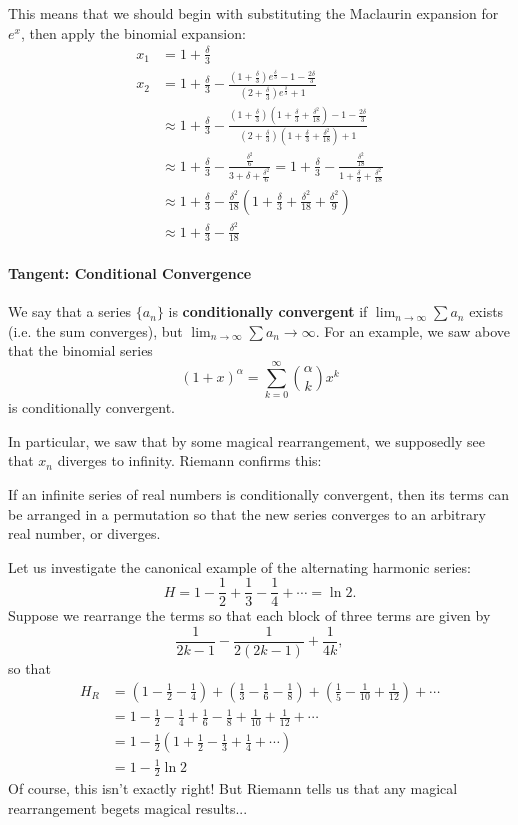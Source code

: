 \documentclass[../main.tex]{subfiles}
\begin{document}
This means that we should begin with substituting the Maclaurin expansion for $e^x$, then apply the binomial expansion:
\begin{align*}
    x_1 &= 1+\frac{\delta}{3}\\
    x_2 &= 1+\frac{\delta}{3}-\frac{\left(1+\frac{\delta}{3}\right)e^{\frac{\delta}{3}}-1-\frac{2\delta}{3}}{\left(2+\frac{\delta}{3}\right)e^\frac{\delta}{3}+1} \\
    &\approx 1+\frac{\delta}{3}-\frac{\left(1+\frac{\delta}{3}\right)\left(1+\frac{\delta}{3}+\frac{\delta^2}{18}\right)-1-\frac{2\delta}{3}}{\left(2+\frac{\delta}{3}\right)\left(1+\frac{\delta}{3}+\frac{\delta^2}{18}\right)+1} \\
    &\approx 1+\frac{\delta}{3}-\frac{\frac{\delta^2}{6}}{3+\delta+\frac{\delta^2}{6}} =1+\frac{\delta}{3}-\frac{\frac{\delta^2}{18}}{1+\frac{\delta}{3}+\frac{\delta^2}{18}} \\
    &\approx 1+\frac{\delta}{3}-\frac{\delta^2}{18}\left(1+\frac{\delta}{3}+\frac{\delta^2}{18}+\frac{\delta^2}{9}\right) \\ 
    &\approx 1+\frac{\delta}{3}-\frac{\delta^2}{18}
\end{align*}

\paragraph{Tangent: Conditional Convergence}
We say that a series $\{a_n\}$ is \textbf{conditionally convergent} if $\lim_{n\to\infty}\sum a_n$ exists (i.e. the sum converges), but $\lim_{n\to\infty}\sum a_n \to \infty$. For an example, we saw above that the binomial series
$$(1+x)^{\alpha}=\sum_{k=0}^{\infty}\binom{\alpha}{k}x^k$$
is conditionally convergent.

In particular, we saw that by some magical rearrangement, we supposedly see that $x_n$ diverges to infinity. Riemann confirms this:
\begin{theorem}
If an infinite series of real numbers is conditionally convergent, then its terms can be arranged in a permutation so that the new series converges to an arbitrary real number, or diverges.
\end{theorem}
Let us investigate the canonical example of the alternating harmonic series:
$$H=1-\frac{1}{2}+\frac{1}{3}-\frac{1}{4}+\cdots=\ln{2}.$$
Suppose we rearrange the terms so that each block of three terms are given by
$$\frac{1}{2k-1}-\frac{1}{2(2k-1)}+\frac{1}{4k},$$
so that 
\begin{align*}
    H_{R}&=\left(1-\frac{1}{2}-\frac{1}{4}\right)+\left(\frac{1}{3}-\frac{1}{6}-\frac{1}{8}\right)+\left(\frac{1}{5}-\frac{1}{10}+\frac{1}{12}\right)+\cdots \\
    &=1-\frac{1}{2}-\frac{1}{4}+\frac{1}{6}-\frac{1}{8}+\frac{1}{10}+\frac{1}{12} +\cdots \\
    &=1-\frac{1}{2}\left(1+\frac{1}{2}-\frac{1}{3}+\frac{1}{4}+\cdots\right) \\
    &=1-\frac{1}{2}\ln{2}
\end{align*}
Of course, this isn't exactly right! But Riemann tells us that any magical rearrangement begets magical results...
\end{document}
